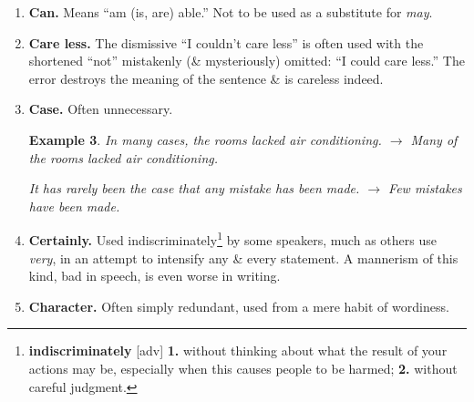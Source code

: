 \documentclass[oneside]{book}
\numberwithin{equation}{section}
\newtheorem{example}{Example}[chapter]
\begin{document}
\begin{enumerate}
	\begin{example}
		I have no doubt but that $\to$ I have no doubt that.
		
		He could not help but see that. $\to$ He could not help seeing that.
	\end{example}
	The too-frequent use of \textit{but} as a conjunction leads to the fault discussed under Rule 18. A loose sentence formed with \textit{but} can usually be converted into a periodic sentence formed with \textit{although}.
	
	Particularly awkward is one \textit{but} closely following another, thus making a contrast to a contrast, or a reservation to a reservation. This is easily corrected by rearrangement.
	
	\begin{example}
		Our country has vast resources but seemed almost wholly unprepared for war. But within a year it had created an army of 4 million.
		
		$\hookrightarrow$ Our country seemed almost wholly unprepared for war, but it had vast resources. Within a year it had created an army of 4 million.
	\end{example}
	\item \textbf{Can.} Means ``am (is, are) able.'' Not to be used as a substitute for \textit{may}.
	\item \textbf{Care less.} The dismissive ``I couldn't care less'' is often used with the shortened ``not'' mistakenly (\& mysteriously) omitted: ``I could care less.'' The error destroys the meaning of the sentence \& is careless indeed.
	\item \textbf{Case.} Often unnecessary.
	
	\begin{example}
		In many cases, the rooms lacked air conditioning. $\to$ Many of the rooms lacked air conditioning.
		
		It has rarely been the case that any mistake has been made. $\to$ Few mistakes have been made.
	\end{example}
	\item \textbf{Certainly.} Used indiscriminately\footnote{\textbf{indiscriminately} [adv] \textbf{1.} without thinking about what the result of your actions may be, especially when this causes people to be harmed; \textbf{2.} without careful judgment.} by some speakers, much as others use \textit{very}, in an attempt to intensify any \& every statement. A mannerism of this kind, bad in speech, is even worse in writing.
	\item \textbf{Character.} Often simply redundant, used from a mere habit of wordiness.
	

\end{enumerate}
\end{document}
